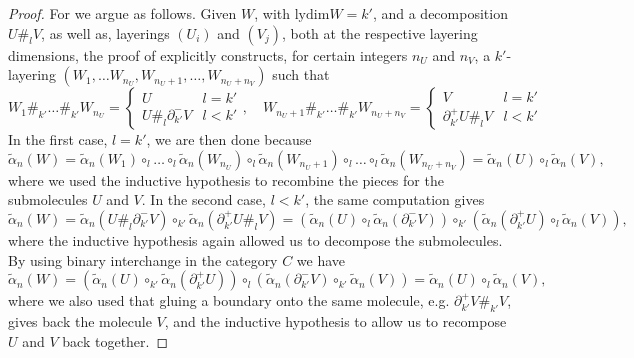 \documentclass[12pt,a4paper]{article}
\numberwithin{equation}{section}
\begin{document}
\begin{proof}
    For  we argue as follows. Given $W$, with $\mathrm{lydim} W = k'$, and a decomposition $U \#_l V$, as well as, layerings $(U_i)$ and $(V_j)$, both at the respective layering dimensions, the proof of \cite[Thm.\,4.2.12]{hadzihasanovic} explicitly constructs, for certain integers $n_U$ and $n_V$, a $k'$-layering $(W_1, \dots W_{n_U}, W_{n_U+1}, \dots, W_{n_U + n_V})$ such that
    \begin{equation}
        W_1 \#_{k'} \dots \#_{k'} W_{n_U} = \begin{cases}
            U & l = {k'} \\
            U \#_l \partial_{k'}^- V & l < k'
        \end{cases}, \quad
        W_{n_U + 1} \#_{k'} \dots \#_{k'} W_{n_U + n_V} = \begin{cases}
            V & l = {k'} \\
            \partial_{k'}^+ U \#_l V & l < k'
        \end{cases}
    \end{equation}
    In the first case, $l = k'$, we are then done because
    \begin{equation}
        \tilde{\alpha}_n (W) = \tilde{\alpha}_n (W_1) \circ_{l} \dots \circ_{l} \tilde{\alpha}_n (W_{n_U}) \circ_{l} \tilde{\alpha}_n (W_{n_U + 1}) \circ_{l} \dots \circ_{l} \tilde{\alpha}_n (W_{n_U + n_V}) = \tilde{\alpha}_n (U) \circ_{l} \tilde{\alpha}_n (V),
    \end{equation}
    where we used the inductive hypothesis to recombine the pieces for the submolecules $U$ and $V$. In the second case, $l < k'$, the same computation gives
    \begin{equation}
        \tilde{\alpha}_n (W) = \tilde{\alpha}_n (U \#_l \partial_{k'}^- V) \circ_{k'} \tilde{\alpha}_n (\partial_{k'}^+ U \#_l V) = \left( \tilde{\alpha}_n (U) \circ_l \tilde{\alpha}_n (\partial_{k'}^- V) \right) \circ_{k'} \left( \tilde{\alpha}_n (\partial_{k'}^+ U) \circ_l \tilde{\alpha}_n (V) \right),
    \end{equation}
    where the inductive hypothesis again allowed us to decompose the submolecules. By using binary interchange in the category $C$ we have
    \begin{equation}
        \tilde{\alpha}_n (W) = \left( \tilde{\alpha}_n (U) \circ_{k'} \tilde{\alpha}_n (\partial_{k'}^+ U) \right) \circ_{l} \left( \tilde{\alpha}_n (\partial_{k'}^- V) \circ_{k'} \tilde{\alpha}_n (V) \right) = \tilde{\alpha}_n (U) \circ_{l} \tilde{\alpha}_n (V),
    \end{equation}
    where we also used that gluing a boundary onto the same molecule, e.g. $\partial_{k'}^+ V \#_{k'} V $, gives back the molecule $V$, and the inductive hypothesis to allow us to recompose $U$ and $V$ back together.


\end{proof}
\end{document}
